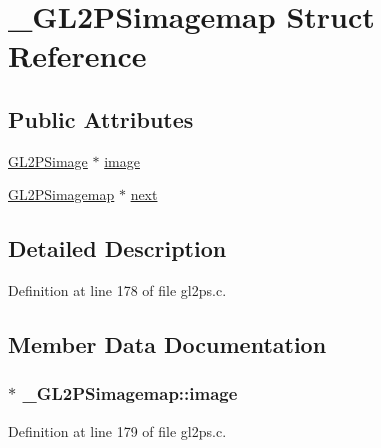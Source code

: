 \hypertarget{struct___g_l2_p_simagemap}{}\section{\+\_\+\+G\+L2\+P\+Simagemap Struct Reference}
\label{struct___g_l2_p_simagemap}
\subsection*{Public Attributes}
\begin{DoxyCompactItemize}
\item 
\hyperlink{struct_g_l2_p_simage}{G\+L2\+P\+Simage} $\ast$ \hyperlink{struct___g_l2_p_simagemap_ac8e6f89e59230658ffc9cf5a4e194f15}{image}
\item 
\hyperlink{gl2ps_8c_a12e221903db330081b8f4f9f193f3bd4}{G\+L2\+P\+Simagemap} $\ast$ \hyperlink{struct___g_l2_p_simagemap_aa409b7a2920f3cf3092845d05786831c}{next}
\end{DoxyCompactItemize}


\subsection{Detailed Description}


Definition at line 178 of file gl2ps.\+c.



\subsection{Member Data Documentation}
\hypertarget{struct___g_l2_p_simagemap_ac8e6f89e59230658ffc9cf5a4e194f15}{}
\subsubsection[{image}]{$\ast$ \+\_\+\+G\+L2\+P\+Simagemap\+::image}\label{struct___g_l2_p_simagemap_ac8e6f89e59230658ffc9cf5a4e194f15}


Definition at line 179 of file gl2ps.\+c.

\hypertarget{struct___g_l2_p_simagemap_aa409b7a2920f3cf3092845d05786831c}{}

